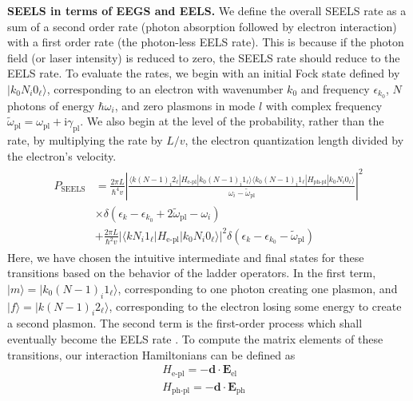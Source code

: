 \documentclass [11pt, proquest] {uwthesis}[2016/11/22]
\begin{document}
{\bf SEELS in terms of EEGS and EELS.} We define the overall SEELS rate as a sum of a second order rate (photon absorption followed by electron interaction) with a first order rate (the photon-less EELS rate). This is because if the photon field (or laser intensity) is reduced to zero, the SEELS rate should reduce to the EELS rate. To evaluate the rates, we begin with an initial Fock state defined by $|k_0N_i0_{\ell}\rangle$, corresponding to an electron with wavenumber $k_0$ and frequency $\epsilon_{k_0}$, $N$ photons of energy $\hbar\omega_i$, and zero plasmons in mode $l$ with complex frequency $\tilde{\omega}_{\textrm{pl}}=\omega_{\textrm{pl}}+\textrm{i}\gamma_{\textrm{pl}}$. We also begin at the level of the probability, rather than the rate, by multiplying the rate by $L/v$, the electron quantization length divided by the electron's velocity.
\begin{align}
\begin{split}
  P_{\textrm{SEELS}} &= \frac{2\pi L}{\hbar^4v}\left|\frac{\langle k(N-1)_i2_{\ell}|H_{\textrm{e-pl}}|k_0(N-1)_i1_{\ell}\rangle\langle k_0(N-1)_i1_{\ell}|H_{\textrm{ph-pl}}|k_0N_i0_{\ell}\rangle}{\omega_i - \tilde{\omega}_{\textrm{pl}}}\right|^2\\
  & \times\delta(\epsilon_k - \epsilon_{k_0} + 2\tilde{\omega}_{\textrm{pl}} - \omega_i)\\
  &+ \frac{2\pi L}{\hbar^2v}|\langle kN_i1_{\ell}|H_{\textrm{e-pl}}|k_0N_i0_{\ell}\rangle|^2\delta(\epsilon_k - \epsilon_{k_0} - \tilde{\omega}_{\textrm{pl}})
  \label{overall_rate}
  \end{split}
\end{align}
Here, we have chosen the intuitive intermediate and final states for these transitions based on the behavior of the ladder operators. In the first term, $|m\rangle = |k_0(N-1)_i1_{\ell}\rangle$, corresponding to one photon creating one plasmon, and $|f\rangle = |k (N-1)_i 2_{\ell}\rangle$, corresponding to the electron losing some energy to create a second plasmon. The second term is the first-order process which shall eventually become the EELS rate \cite{EEGS}. To compute the matrix elements of these transitions, our interaction Hamiltonians can be defined as
\begin{equation}
\begin{aligned}
H_{\textrm{e-pl}} = -\textbf{d} \cdot \textbf{E}_{\textrm{el}}&\\
H_{\textrm{ph-pl}} = -\textbf{d} \cdot \textbf{E}_{\textrm{ph}}&
\end{aligned}
\end{equation}
\end{document}
